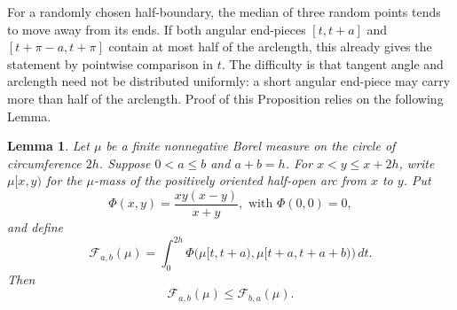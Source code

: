 \documentclass[final,12pt]{elsarticle}
\numberwithin{equation}{section}
\newtheorem{lem}[thm]{Lemma}
\theoremstyle{remark}
\theoremstyle{definition}
\begin{document}
For a randomly chosen half-boundary, the median of three random points tends to move away from its ends. If both angular end-pieces \([t,t+a]\) and \([t+\pi-a,t+\pi]\) contain at most half of the arclength, this already gives the statement by pointwise comparison in \(t\). The difficulty is that tangent angle and arclength need not be distributed uniformly: a short angular end-piece may carry more than half of the arclength. Proof of this Proposition relies on the following Lemma.
\begin{lem}\label{lem:cyclic-block}
Let $\mu$ be a finite nonnegative Borel measure on the circle of circumference $2h$.  Suppose
$0<a\le b$ and $a+b=h$.  For $x<y\le x+2h$, write $\mu[x,y)$ for the $\mu$-mass of the positively oriented half-open arc from $x$ to $y$. Put
\[
    \Phi(x,y)=\frac{xy(x-y)}{x+y}, \,\,\text{with} \,\,\Phi(0,0)=0,
\]
and define
\begin{equation}\label{eq:block-functional}
    \mathcal F_{a,b}(\mu)
    =\int_0^{2h}
      \Phi\bigl(\mu[t,t+a),\mu[t+a,t+a+b)\bigr)\,dt.
\end{equation}
Then
\begin{equation}\label{eq:block-inequality}
    \mathcal F_{a,b}(\mu)\le \mathcal F_{b,a}(\mu).
\end{equation}
\end{lem}
\end{document}
